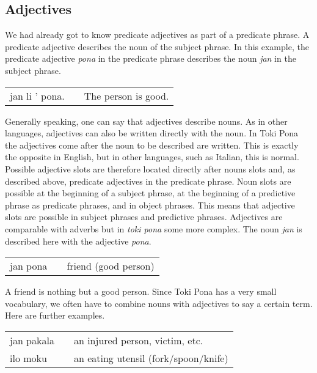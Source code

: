\subsection*{Adjectives}
%

We had already got to know predicate adjectives as part of a predicate phrase. 
A predicate adjective describes the noun of the subject phrase.
In this example, the predicate adjective \textit{pona} in the predicate phrase describes the noun \textit{jan} in the subject phrase.

\begin{supertabular}{p{5,5cm}|ll}
jan li ' pona. &&  The person is good. \\
\end{supertabular} 

Generally speaking, one can say that adjectives describe nouns. 
As in other languages, adjectives can also be written directly with the noun. 
In Toki Pona the adjectives come after the noun to be described are written. 
This is exactly the opposite in English, but in other languages, such as Italian, this is normal.
Possible adjective slots are therefore located directly after nouns slots and, as described above, predicate adjectives in the predicate phrase. 
Noun slots are possible at the beginning of a subject phrase, at the beginning of a predictive phrase as predicate phrases, and in object phrases. 
This means that adjective slots are possible in subject phrases and predictive phrases.
Adjectives are comparable with adverbs but in \textit{toki pona} some more complex.
The noun \textit{jan} is described here with the adjective \textit{pona}.

\begin{supertabular}{p{5,5cm}|ll}
jan pona && friend (good person) \\
\end{supertabular} 

A friend is nothing but a good person.
Since Toki Pona has a very small vocabulary, we often have to combine nouns with adjectives to say a certain term. 
Here are further examples. 

\begin{supertabular}{p{5,5cm}|ll}
jan pakala && an injured person, victim, etc. \\
ilo moku && an eating utensil (fork/spoon/knife) \\
\end{supertabular} 


